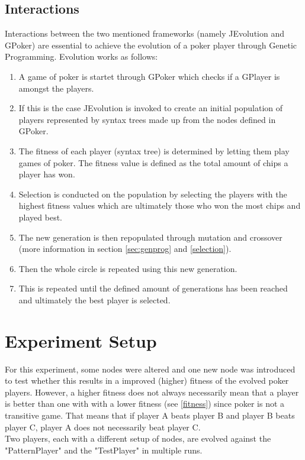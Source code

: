 \documentclass[12pt,fleqn,a4paper]{article}
\begin{document}
\subsection{Interactions}
Interactions between the two mentioned frameworks (namely JEvolution and GPoker) are essential to achieve the evolution of a poker player through Genetic Programming. Evolution works as follows:
\begin{enumerate}
	\item A game of poker is startet through GPoker which checks if a GPlayer is amongst the players.
	\item If this is the case JEvolution is invoked to create an initial population of players represented by syntax trees
	made up from the nodes defined in GPoker.
	\item The fitness of each player (syntax tree) is determined by letting them play games of poker. The fitness value is defined as the total amount of chips a player has won.
	\item Selection is conducted on the population by selecting the players with the highest fitness values which are ultimately those who won the most chips and played best.
	\item The new generation is then repopulated through mutation and crossover (more information in section \ref{sec:genprog} and \ref{selection}).
	\item Then the whole circle is repeated using this new generation.
	\item This is repeated until the defined amount of generations has been reached and ultimately the best player is selected.
\end{enumerate}

\section{Experiment Setup}
For this experiment, some nodes were altered and one new node was introduced to test whether this results in a improved (higher) fitness of the evolved poker players. However, a higher fitness does not always necessarily mean that a player is better than one with with a lower fitness (see \ref{fitness}) since poker is not a transitive game. That means that if player A beats player B and player B beats player C, player A does not necessarily beat player C.\\
Two players, each with a different setup of nodes, are evolved against the "PatternPlayer" and the "TestPlayer" in multiple runs.
\end{document}
